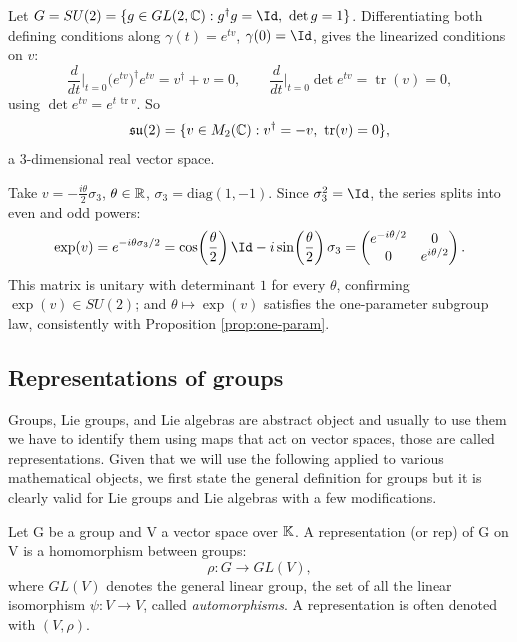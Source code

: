 \begin{example}
	Let $G = SU(2) = \{g \in GL(2,\C) : g^\dagger g = \Id,\ \det g = 1\}$. Differentiating both defining conditions along $\gamma(t) = e^{tv}$, $\gamma(0)= \Id$, gives the linearized conditions on $v$:
	\[
	\frac{d}{dt}\Big|_{t=0} \big(e^{tv}\big)^\dagger e^{tv} = v^\dagger + v = 0, \qquad
	\frac{d}{dt}\Big|_{t=0} \det e^{tv} = \operatorname{tr}(v) = 0,
	\]
	using $\det e^{tv} = e^{t\,\operatorname{tr} v}$. So
	\[
	\mathfrak{su}(2) = \{v \in M_2(\mathbb{C}) : v^\dagger = -v,\ \operatorname{tr}(v) = 0\},
	\]
	a $3$-dimensional real vector space.
	
	Take $v = -\tfrac{i\theta}{2}\sigma_3$, $\theta \in \mathbb{R}$, $\sigma_3 = \mathrm{diag}(1,-1)$. Since $\sigma_3^2 = \Id$, the series splits into even and odd powers:
	\[
	\exp(v) = e^{-i\theta\sigma_3/2} = \cos\!\left(\frac{\theta}{2}\right) \Id - i\sin\!\left(\frac{\theta}{2}\right)\sigma_3
	= \begin{pmatrix} e^{-i\theta/2} & 0 \\ 0 & e^{i\theta/2} \end{pmatrix}.
	\]
	This matrix is unitary with determinant $1$ for every $\theta$, confirming $\exp(v) \in SU(2)$; and $\theta \mapsto \exp(v)$ satisfies the one-parameter subgroup law, consistently with Proposition \ref{prop:one-param}. 
\end{example}


\subsection{Representations of groups}
Groups, Lie groups, and Lie algebras are abstract object and usually to use them we have to identify them using maps that act on vector spaces, those are called representations. Given that we will use the following applied to various mathematical objects, we first state the general definition for groups but it is clearly valid for Lie groups and Lie algebras with a few modifications. \cite{hallLieGroupsLie2003}

\begin{definition}\label{def:group-rep}
	Let G be a group and V a vector space over $\mathbb{K}$. A representation (or rep) of G on V is a homomorphism between groups:
	\[
		\rho : G \to GL(V),
	\]
	where $GL(V)$ denotes the general linear group, the set of all the linear isomorphism $\psi: V \to V$, called \textit{automorphisms}. A representation is often denoted with $(V, \rho)$.
\end{definition}

